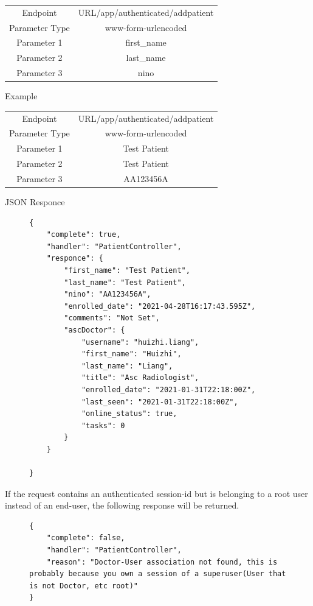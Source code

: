 					\begin{center}
						\begin{tabular}{ |c|c| } 
							\hline
							Endpoint & {{URL}}/app/authenticated/addpatient\\
							Parameter Type & www-form-urlencoded  \\
							Parameter 1 & first\_name\\
							Parameter 2 & last\_name  \\
							Parameter 3 & nino  \\
							\hline
						\end{tabular}
					\end{center}
					Example
					\begin{center}
						\begin{tabular}{ |c|c| } 
							\hline
							Endpoint & {{URL}}/app/authenticated/addpatient\\
							Parameter Type & www-form-urlencoded  \\
							Parameter 1 & Test Patient\\
							Parameter 2 & Test Patient  \\
							Parameter 3 & AA123456A  \\
							\hline
						\end{tabular}
					\end{center}
					JSON Responce
					\begin{figure}[H]
						\iftrue
						\begin{lstlisting}[]
{
	"complete": true,
	"handler": "PatientController",
	"responce": {
		"first_name": "Test Patient",
		"last_name": "Test Patient",
		"nino": "AA123456A",
		"enrolled_date": "2021-04-28T16:17:43.595Z",
		"comments": "Not Set",
		"ascDoctor": {
			"username": "huizhi.liang",
			"first_name": "Huizhi",
			"last_name": "Liang",
			"title": "Asc Radiologist",
			"enrolled_date": "2021-01-31T22:18:00Z",
			"last_seen": "2021-01-31T22:18:00Z",
			"online_status": true,
			"tasks": 0
		}
	}
	
}
						\end{lstlisting}
					\end{figure}
					If the request contains an authenticated session-id but is belonging to a root user instead of an end-user, 
					the following response will be returned.
					\begin{figure}[H]
						\iftrue
						\begin{lstlisting}[]
{
	"complete": false,
	"handler": "PatientController",
	"reason": "Doctor-User association not found, this is probably because you own a session of a superuser(User that is not Doctor, etc root)"
}
						\end{lstlisting}
					\end{figure}
